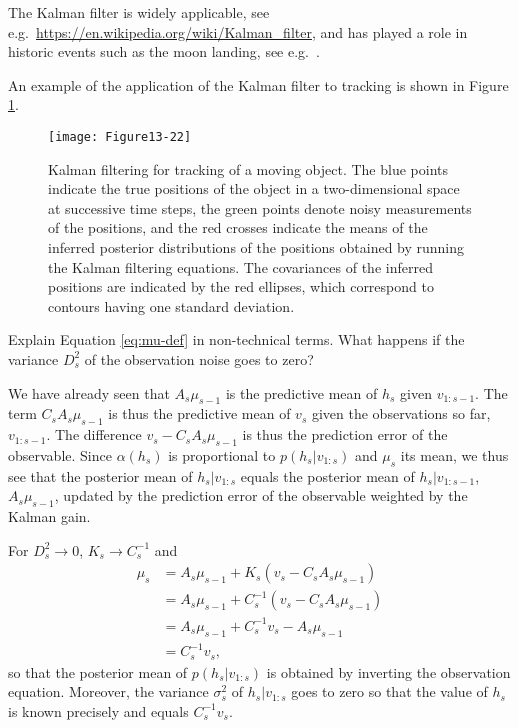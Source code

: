 \begin{exenumerate}
\begin{solution}
       The Kalman filter is widely applicable, see
       e.g.\ \url{https://en.wikipedia.org/wiki/Kalman_filter}, and
       has played a role in historic events such as the moon
       landing, see e.g.\ \citep{Grewal2010}.

       An example of the application of the Kalman filter to tracking is shown in Figure \ref{fig:Kalman-tracking}.
     \begin{figure}[h]
       \centering
       \texttt{[image: Figure13-22]}
       \caption{ \label{fig:Kalman-tracking} Kalman filtering for tracking of a moving object. The blue points indicate the true positions of the object in a two-dimensional space at successive time steps, the green points denote noisy measurements of the positions, and the red crosses indicate the means of the inferred posterior distributions of the positions obtained by running the Kalman filtering equations. The covariances of the inferred positions are indicated by the red ellipses, which correspond to contours having one standard deviation. \citep[Figure 13.22]{Bishop2006}}
     \end{figure}
     
      
     \end{solution}
     
   \item Explain Equation \eqref{eq:mu-def} in non-technical terms. What happens if the variance $D_s^2$ of the observation noise goes to zero?
     
     \begin{solution}
       We have already seen that $A_s \mu_{s-1}$ is the predictive
       mean of $h_s$ given $v_{1:s-1}$. The term $C_s A_s \mu_{s-1}$
       is thus the predictive mean of $v_s$ given the observations so
       far, $v_{1:s-1}$. The difference $v_s - C_s A_s \mu_{s-1}$ is
       thus the prediction error of the observable. Since $\alpha(h_s)$ is
       proportional to $p(h_s | v_{1:s})$ and $\mu_s$ its mean, we
       thus see that the posterior mean of $h_s | v_{1:s}$ equals the
       posterior mean of $h_s | v_{1:s-1}$, $A_s \mu_{s-1}$, updated
       by the prediction error of the observable weighted by the
       Kalman gain.

       For $D_s^2 \to 0$, $K_s \to C_s^{-1}$ and
        \begin{align}
          \mu_s & = A_s \mu_{s-1} + K_s \left(v_s - C_s A_s \mu_{s-1}\right) \\
          & = A_s \mu_{s-1} + C_s^{-1} \left(v_s - C_s A_s \mu_{s-1}\right) \\
          & = A_s \mu_{s-1} + C_s^{-1} v_s - A_s \mu_{s-1}\\
          & =  C_s^{-1} v_s,
        \end{align}
        so that the posterior mean of $p(h_s | v_{1:s})$ is obtained
        by inverting the observation equation. Moreover, the variance
        $\sigma_s^2$ of $h_s | v_{1:s}$ goes to zero so that the value
        of $h_s$ is known precisely and equals $C_s^{-1} v_s$.
       
     \end{solution}
\end{exenumerate}

